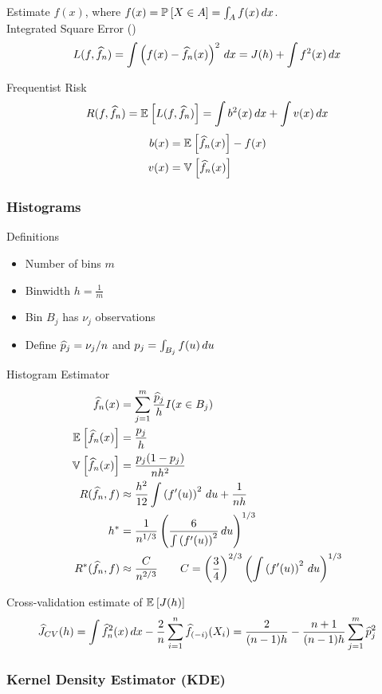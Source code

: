 \documentclass[landscape]{article}
\begin{document}
\begin{multicols*}{2}
Estimate $f(x)$, where $f(x) = \mathbb{P}_{}\left[X \in A\right] = \int_A f(x)\,dx$.\\

Integrated Square Error (\ise)
$$L(f, \widehat{f}_n) = \int\left(f(x) - \widehat{f}_n(x)\right)^2 \,dx = J(h)+\int f^2(x)\,dx$$

Frequentist Risk
$$R(f, \widehat{f}_n) = \mathbb{E}_{}\left[L(f,\widehat{f}_n)\right] = \int b^2(x) \,dx + \int v(x) \,dx$$
\begin{align*}
  b(x) &= \mathbb{E}_{}\left[\widehat{f}_n(x)\right] - f(x) \\
  v(x) &= \mathbb{V}_{}\left[\widehat{f}_n(x)\right]
\end{align*}

\subsubsection{Histograms}

Definitions
\begin{itemize}
  \item Number of bins $m$
  \item Binwidth $h = \frac{1}{m}$
  \item Bin $B_j$ has $\nu_j$ observations
  \item Define $\widehat{p}_j = \nu_j/n$ and $p_j = \int_{B_j} f(u)\,du$
\end{itemize}

Histogram Estimator
\begin{align*}
\widehat{f}_n(x) &= \sum_{j=1}^m \frac{\widehat{p}_j}{h} I(x\in B_j) \\
\mathbb{E}_{}\left[\widehat{f}_n(x)\right] &= \frac{p_j}{h} \\
\mathbb{V}_{}\left[\widehat{f}_n(x)\right] &= \frac{p_j(1-p_j)}{nh^2} \\
R(\widehat{f}_n,f) &\approx 
\frac{h^2}{12} \int \left(f^\prime(u)\right)^2 \,du + \frac{1}{nh} \\
h^* &= \frac{1}{n^{1/3}} \left( \frac{6}{\int\left(f^\prime(u) \right)^2}\,du
\right)^{1/3} \\
R^*(\widehat{f}_n,f) &\approx \frac{C}{n^{2/3}} \qquad 
C = \left(\frac{3}{4}\right)^{2/3} \left( \int\left( f^\prime(u) \right)^2 \,du
\right)^{1/3}
\end{align*}

Cross-validation estimate of $\mathbb{E}_{}\left[J(h)\right]$
$$\widehat{J}_{CV}(h) 
= \int \widehat{f}_n^2(x) \,dx - \frac{2}{n}\sum_{i=1}^n \widehat{f}_{(-i)}(X_i)
= \frac{2}{(n-1)h} - \frac{n+1}{(n-1)h} \sum_{j=1}^m \widehat{p}_j^2$$

\subsubsection{Kernel Density Estimator (KDE)}


\end{multicols*}
\end{document}
